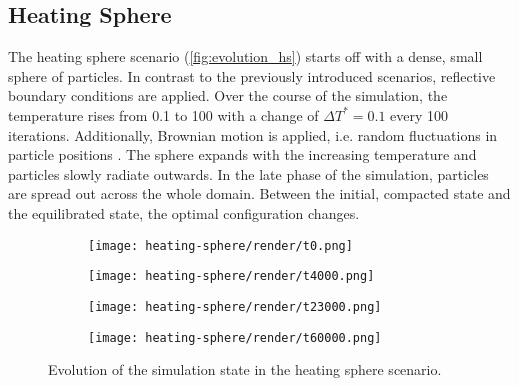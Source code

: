 \subsection{Heating Sphere}
\label{subsec:hs}
The heating sphere scenario (\autoref{fig:evolution_hs}) starts off with a dense, small sphere of particles. In contrast to the previously introduced scenarios, reflective boundary conditions are applied. Over the course of the simulation, the temperature rises from \num{0.1} to \num{100} with a change of $\Delta \si{T^{*}}=0.1$ every \num{100} iterations. Additionally, Brownian motion is applied, i.e. random fluctuations in particle positions \cite{Moerters2010}. The sphere expands with the increasing temperature and particles slowly radiate outwards. In the late phase of the simulation, particles are spread out across the whole domain.
Between the initial, compacted state and the equilibrated state, the optimal configuration changes.

\begin{figure}[htpb]
	\centering
	\fastcolorbarhor

	\begin{subfigure}[c]{.25\textwidth}
		\texttt{[image: heating-sphere/render/t0.png]}
	\end{subfigure}%
	\begin{subfigure}[c]{.25\textwidth}
		\texttt{[image: heating-sphere/render/t4000.png]}
	\end{subfigure}%
	\begin{subfigure}[c]{.25\textwidth}
		\texttt{[image: heating-sphere/render/t23000.png]}
	\end{subfigure}%
	\begin{subfigure}[c]{.25\textwidth}
		\vspace*{0.1\textwidth}
		\centering
		\texttt{[image: heating-sphere/render/t60000.png]}
		\vspace*{0.1\textwidth}
	\end{subfigure}%
	\caption{Evolution of the simulation state in the heating sphere scenario.}
	\label{fig:evolution_hs}
\end{figure}

